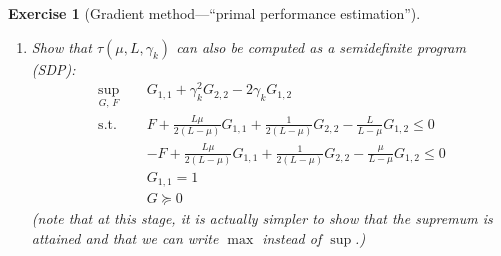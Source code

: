 \documentclass[11pt,a4paper]{article}
\newtheorem{exercise}{Exercise}
\begin{document}
\begin{exercise}[Gradient method---``primal performance estimation'']
\begin{enumerate}
{			\begin{equation*}
			\begin{aligned}
			\sup_{d,\,G,\, F} \quad & \frac{G_{1,1}+\gamma_k ^2 G_{2,2}-2\gamma_k G_{1,2}}{G_{1,1}}\\
			\text{s.t. } \quad & F + \tfrac{L\mu}{2(L-\mu)} G_{1,1}+\tfrac{1}{2(L-\mu)}G_{2,2}-\tfrac{L}{L-\mu}G_{1,2}\leqslant 0\\
			&-F + \tfrac{L\mu}{2(L-\mu)} G_{1,1}+\tfrac{1}{2(L-\mu)}G_{2,2}-\tfrac{\mu}{L-\mu}G_{1,2}\leqslant 0\\
			&G\succcurlyeq 0\\
			&\mathrm{rank}(G)\leqslant d,
			\end{aligned}	
			\end{equation*}
with the same optimal value. Obviously, any feasible point to the last problem is feasible (with the same objective value) for~\eqref{ex1:eq:SDP_grad1}, and the optimal value of~\eqref{ex1:eq:SDP_grad1} is therefore at least equal to the optimal value of~\eqref{ex1:eq:base_pep3} (any feasible point to~\eqref{ex1:eq:base_pep3} can be translated to a feasible point of~\eqref{ex1:eq:SDP_grad1} with the same objective value).
	
	In the other direction, from any feasible point $(G,F)$ of~\eqref{ex1:eq:SDP_grad1}: $G\succcurlyeq 0$ with $\mathrm{rank}(G)\leq d$ (for some $d\in\mathbb{N}$, with $d\leqslant 2$ due to the fact $G\in\mathbb{S}^2$), one can obtain some $P\in\mathbb{R}^{d\times 2}$ with $G=P^{\top\!}P$ (note: $P$ is usually not unique). Choosing $x_\star=0\in\mathbb{R}^d$, $x_k=P_{:,1}$ (first column of $P$) and $g_k=P_{:,2}$, as well as $x_{k+1}=x_k-\gamma_k g_k$, $f_\star=0$ and $f_k=F$, we obtain a feasible point to~\eqref{ex1:eq:base_pep3} (the inequalities of~\eqref{ex1:eq:base_pep3} in terms of $(P,F)$ are exactly those of~\eqref{ex1:eq:SDP_grad1} expressed in terms of $(G,F)$) with the same objective value.
	
	
	}
	
	\item Show that $\tau(\mu,L,\gamma_k)$ can also be computed as a semidefinite program (SDP):
			\begin{equation}\label{ex1:eq:SDP_grad2}
			\begin{aligned}
			\sup_{G,\, F} \quad & G_{1,1}+\gamma_k ^2 G_{2,2}-2\gamma_k G_{1,2}\\
			\text{s.t. } \quad & F + \tfrac{L\mu}{2(L-\mu)} G_{1,1}+\tfrac{1}{2(L-\mu)}G_{2,2}-\tfrac{L}{L-\mu}G_{1,2}\leqslant 0\\
			&-F + \tfrac{L\mu}{2(L-\mu)} G_{1,1}+\tfrac{1}{2(L-\mu)}G_{2,2}-\tfrac{\mu}{L-\mu}G_{1,2}\leqslant 0\\
			&G_{1,1}= 1\\
			&G\succcurlyeq 0
			\end{aligned}
			\end{equation}
	(note that at this stage, it is actually simpler to show that the supremum is attained and that we can write $\max$ instead of $\sup$.)
	

\end{enumerate}
\end{exercise}
\end{document}
